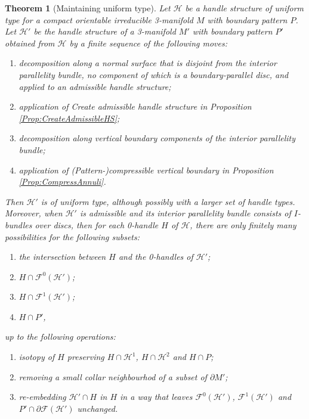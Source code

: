 \documentclass[oneside]{amsart}
\numberwithin{equation}{section}
\theoremstyle{plain}
\newtheorem{theorem}[equation]{Theorem}
\theoremstyle{definition}
\newcommand{\calH}{\mathcal{H}}
\newcommand{\calF}{\mathcal{F}}
\begin{document}
\begin{theorem}[Maintaining uniform type]
\label{Thm:RemainUniformType}
Let $\mathcal{H}$ be a handle structure of uniform type for a compact orientable irreducible 3-manifold $M$ with boundary pattern $P$. Let $\mathcal{H}'$ be 
the handle structure of a 3-manifold $M'$ with boundary pattern $P'$
obtained from $\mathcal{H}$ by a finite sequence of the following moves:
\begin{enumerate}
\item decomposition along a 
normal surface that is disjoint from the interior parallelity bundle, no component of which is a boundary-parallel disc, and applied to an admissible handle structure;
\item application of {\sc Create admissible handle structure} in Proposition \ref{Prop:CreateAdmissibleHS};
\item decomposition along vertical boundary components of the interior parallelity bundle;
\item application of {\sc (Pattern-)compressible vertical boundary} in Proposition \ref{Prop:CompressAnnuli}.
\end{enumerate}
Then $\mathcal{H}'$ is of uniform type, although possibly with a larger set of handle types. Moreover, when $\mathcal{H}'$ is admissible and its interior parallelity bundle consists of $I$-bundles over discs, then for each 0-handle $H$ of $\mathcal{H}$, there are only finitely many possibilities for the following subsets:
\begin{enumerate}
\item the intersection between $H$ and the 0-handles of $\mathcal{H}'$;
\item $H \cap \mathcal{F}^0(\mathcal{H}')$;
\item $H \cap \mathcal{F}^1(\mathcal{H}')$;
\item $H \cap P'$,
\end{enumerate}
up to the following operations:
\begin{enumerate}
\item isotopy of $H$ preserving $H \cap \mathcal{H}^1$, $H \cap \mathcal{H}^2$ and $H \cap P$;
\item removing a small collar neighbourhod of a subset of $\partial M'$;
\item re-embedding $\calH' \cap H$ in $H$ in a way that leaves $\calF^0(\calH')$, $\calF^1(\calH')$
and $P' \cap \partial \calF(\calH')$ unchanged.
\end{enumerate}
\end{theorem}
\end{document}
